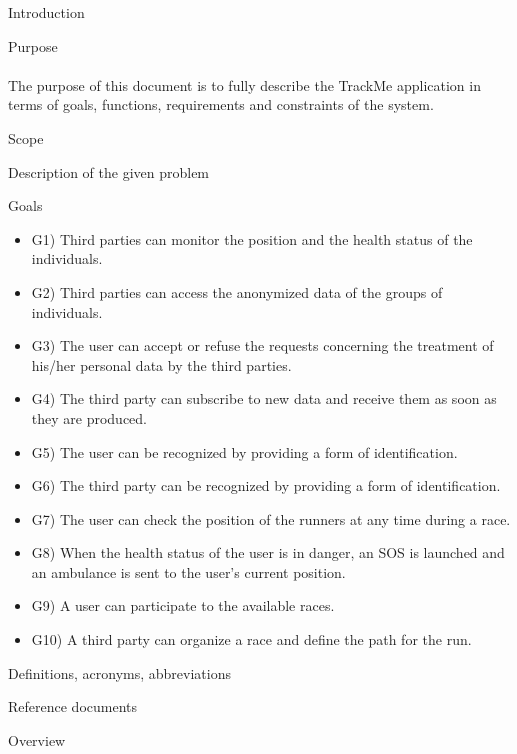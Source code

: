 \documentclass{article}
\begin{document}
	\begin{legal}\bfseries
 	\item Introduction \\
  		\begin{legal}
    		\item Purpose\\
		\\
		{\normalfont The purpose of this document is to fully describe the TrackMe application in terms of goals, functions, requirements and constraints of the system.}
		\\
		\item Scope\\
			\begin{legal}
    			\item Description of the given problem \\
			\item Goals \\
			{\normalfont
				\begin{itemize}
				\item G1) Third parties can monitor the position and the health status of the individuals. \\
				\item G2) Third parties can access the anonymized data of the groups of individuals.\\
				\item G3) The user can accept or refuse the requests concerning the treatment of his/her personal data by the third parties.\\
				\item G4) The third party can subscribe to new data and receive them as soon as they are produced.\\
				\item G5) The user can be recognized by providing a form of identification.\\
				\item G6) The third party can be recognized by providing a form of identification. \\
				\item G7) The user can check the position of the runners at any time during a race.\\
				\item G8) When the health status of the user is in danger, an SOS is launched and an ambulance is sent to the user’s current position.\\
				\item G9) A user can participate to the available races. \\
				\item G10) A third party can organize a race and define the path for the run.\\
				\end{itemize}
				}
			\end{legal}
		\item Definitions, acronyms, abbreviations\\
		\item Reference documents\\
		\item Overview\\
		\end{legal}
	

\end{legal}
\end{document}
